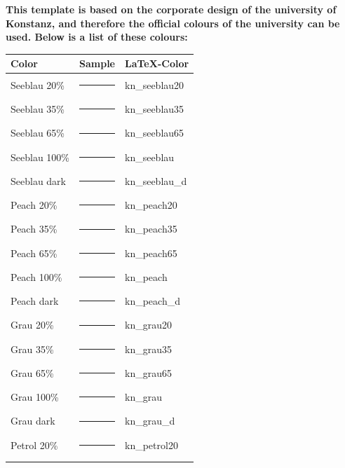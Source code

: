 \textbf{This template is based on the corporate design of the university of
Konstanz, and therefore the official colours of the university can be used.
Below is a list of these colours:}
\begin{center}
    \begin{tabular}{@{}lll@{}}
        \toprule
        Color         & Sample                                      & \LaTeX -Color  \\ \midrule
        Seeblau 20\%  & \textcolor{kn_seeblau20}{\rule{1cm}{0.2cm}} & kn\_seeblau20  \\ \hdashline
        Seeblau 35\%  & \textcolor{kn_seeblau35}{\rule{1cm}{0.2cm}} & kn\_seeblau35  \\ \hdashline
        Seeblau 65\%  & \textcolor{kn_seeblau65}{\rule{1cm}{0.2cm}} & kn\_seeblau65  \\ \hdashline
        Seeblau 100\% & \textcolor{kn_seeblau}{\rule{1cm}{0.2cm}}   & kn\_seeblau    \\ \hdashline
        Seeblau dark  & \textcolor{kn_seeblau_d}{\rule{1cm}{0.2cm}} & kn\_seeblau\_d \\ \hdashline
        Peach 20\%    & \textcolor{kn_peach20}{\rule{1cm}{0.2cm}}   & kn\_peach20    \\ \hdashline
        Peach 35\%    & \textcolor{kn_peach35}{\rule{1cm}{0.2cm}}   & kn\_peach35    \\ \hdashline
        Peach 65\%    & \textcolor{kn_peach65}{\rule{1cm}{0.2cm}}   & kn\_peach65    \\ \hdashline
        Peach 100\%   & \textcolor{kn_peach}{\rule{1cm}{0.2cm}}     & kn\_peach      \\ \hdashline
        Peach dark    & \textcolor{kn_peach_d}{\rule{1cm}{0.2cm}}   & kn\_peach\_d   \\ \hdashline
        Grau 20\%     & \textcolor{kn_grau20}{\rule{1cm}{0.2cm}}    & kn\_grau20     \\ \hdashline
        Grau 35\%     & \textcolor{kn_grau35}{\rule{1cm}{0.2cm}}    & kn\_grau35     \\ \hdashline
        Grau 65\%     & \textcolor{kn_grau65}{\rule{1cm}{0.2cm}}    & kn\_grau65     \\ \hdashline
        Grau 100\%    & \textcolor{kn_grau}{\rule{1cm}{0.2cm}}      & kn\_grau       \\ \hdashline
        Grau dark     & \textcolor{kn_grau_d}{\rule{1cm}{0.2cm}}    & kn\_grau\_d    \\ \hdashline
        Petrol 20\%   & \textcolor{kn_petrol20}{\rule{1cm}{0.2cm}}  & kn\_petrol20   \\ \hdashline

\end{tabular}
\end{center}
